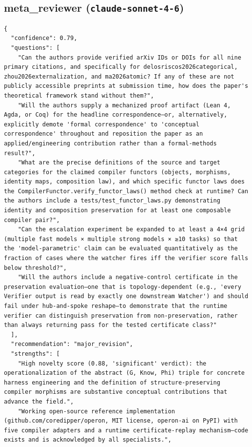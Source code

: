 \documentclass[11pt]{article}
\begin{document}
\subsection*{meta_reviewer (\texttt{claude-sonnet-4-6})}
\begin{verbatim}
{
  "confidence": 0.79,
  "questions": [
    "Can the authors provide verified arXiv IDs or DOIs for all nine primary citations, and specifically for delosriscos2026categorical, zhou2026externalization, and ma2026atomic? If any of these are not publicly accessible preprints at submission time, how does the paper's theoretical framework stand without them?",
    "Will the authors supply a mechanized proof artifact (Lean 4, Agda, or Coq) for the headline correspondence—or, alternatively, explicitly demote 'formal correspondence' to 'conceptual correspondence' throughout and reposition the paper as an applied/engineering contribution rather than a formal-methods result?",
    "What are the precise definitions of the source and target categories for the claimed compiler functors (objects, morphisms, identity maps, composition law), and which specific functor laws does the CompilerFunctor.verify_functor_laws() method check at runtime? Can the authors include a tests/test_functor_laws.py demonstrating identity and composition preservation for at least one composable compiler pair?",
    "Can the escalation experiment be expanded to at least a 4×4 grid (multiple fast models × multiple strong models × ≥10 tasks) so that the 'model-parametric' claim can be evaluated quantitatively as the fraction of cases where the watcher fires iff the verifier score falls below threshold?",
    "Will the authors include a negative-control certificate in the preservation evaluation—one that is topology-dependent (e.g., 'every Verifier output is read by exactly one downstream Watcher') and should fail under hub-and-spoke reshape—to demonstrate that the runtime verifier can distinguish preservation from non-preservation, rather than always returning pass for the tested certificate class?"
  ],
  "recommendation": "major_revision",
  "strengths": [
    "High novelty score (0.88, 'significant' verdict): the operationalization of the abstract (G, Know, Phi) triple for concrete harness engineering and the definition of structure-preserving compiler morphisms are substantive conceptual contributions that advance the field.",
    "Working open-source reference implementation (github.com/coredipper/operon, MIT license, operon-ai on PyPI) with five compiler adapters and a runtime certificate-replay mechanism—code exists and is acknowledged by all specialists.",

\end{verbatim}
\end{document}
